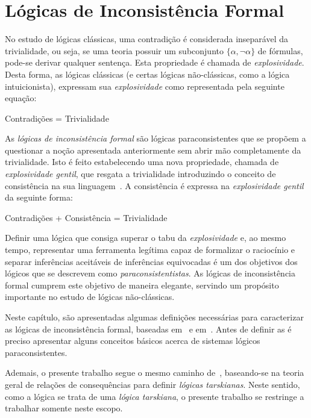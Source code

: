 \chapter{Lógicas de Inconsistência Formal}\label{cap:LFIs}
No estudo de lógicas clássicas, uma contradição é considerada inseparável da trivialidade, ou seja, se uma teoria possuir um subconjunto $\{\alpha,\neg \alpha\}$ de fórmulas, pode-se derivar qualquer sentença. Esta propriedade é chamada de \textit{explosividade}. Desta forma, as lógicas clássicas (e certas lógicas não-clássicas, como a lógica intuicionista), expressam sua \textit{explosividade} como representada pela seguinte equação: 
\begin{center}
    Contradições = Trivialidade
\end{center}
As \textit{lógicas de inconsistência formal} são lógicas paraconsistentes que se propõem a questionar a noção apresentada anteriormente sem abrir mão completamente da trivialidade. Isto é feito estabelecendo uma nova propriedade, chamada de \textit{explosividade gentil}, que resgata a trivialidade introduzindo o conceito de consistência na sua linguagem~\cite{carnielli2007}. A consistência é expressa na \textit{explosividade gentil} da seguinte forma:
\begin{center}
    Contradições + Consistência = Trivialidade
\end{center}
Definir uma lógica que consiga superar o tabu da \textit{explosividade} e, ao mesmo tempo, representar uma ferramenta legítima capaz de formalizar o raciocínio e separar inferências aceitáveis de inferências equivocadas é um dos objetivos dos lógicos que se descrevem como \textit{paraconsistentistas}. As lógicas de inconsistência formal cumprem este objetivo de maneira elegante, servindo um propósito importante no estudo de lógicas não-clássicas.

Neste capítulo, são apresentadas algumas definições necessárias para caracterizar as lógicas de inconsistência formal, baseadas em~ e em~. Antes de definir as \lfis{} é preciso apresentar alguns conceitos básicos acerca de sistemas lógicos paraconsistentes.

Ademais, o presente trabalho segue o mesmo caminho de~, baseando-se na teoria geral de relações de consequências para definir \textit{lógicas tarskianas}. Neste sentido, como a lógica \lfium{} se trata de uma \textit{lógica tarskiana}, o presente trabalho se restringe a trabalhar somente neste escopo. 

